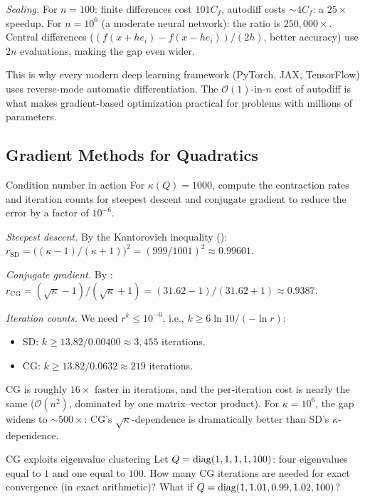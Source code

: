 \textit{Scaling.}
For $n = 100$: finite differences cost $101 C_f$, autodiff costs $\sim 4 C_f$: a $25\times$ speedup.
For $n = 10^6$ (a moderate neural network): the ratio is $250{,}000\times$.
Central differences ($(f(x + he_i) - f(x - he_i))/(2h)$, better accuracy) use $2n$ evaluations, making the gap even wider.

This is why every modern deep learning framework (PyTorch, JAX, TensorFlow) uses reverse-mode automatic differentiation.
The $\mathcal{O}(1)$-in-$n$ cost of autodiff is what makes gradient-based optimization practical for problems with millions of parameters.

\subsection{Gradient Methods for Quadratics}\label{app:ex-quadratic}

\begin{exercise}{Condition number in action}\label{ex:kappa-1000}
	For $\kappa(Q) = 1000$, compute the contraction rates and iteration counts for steepest descent and conjugate gradient to reduce the error by a factor of $10^{-6}$.
\end{exercise}

\solution
\textit{Steepest descent.}
By the Kantorovich inequality ():
$r_{\mathrm{SD}} = \bigl((\kappa - 1)/(\kappa + 1)\bigr)^2 = (999/1001)^2 \approx 0.99601$.

\textit{Conjugate gradient.}
By :
$r_{\mathrm{CG}} = (\sqrt{\kappa} - 1)/(\sqrt{\kappa} + 1) = (31.62 - 1)/(31.62 + 1) \approx 0.9387$.

\textit{Iteration counts.}
We need $r^k \leq 10^{-6}$, i.e., $k \geq 6\ln 10 / (-\ln r)$:
\begin{itemize}
	\item SD: $k \geq 13.82 / 0.00400 \approx 3{,}455$ iterations.
	\item CG: $k \geq 13.82 / 0.0632 \approx 219$ iterations.
\end{itemize}
CG is roughly $16\times$ faster in iterations, and the per-iteration cost is nearly the same ($\mathcal{O}(n^2)$, dominated by one matrix--vector product).
For $\kappa = 10^6$, the gap widens to $\sim 500\times$: CG's $\sqrt{\kappa}$-dependence is dramatically better than SD's $\kappa$-dependence.

\begin{exercise}{CG exploits eigenvalue clustering}\label{ex:cg-few-eigenvalues}
	Let $Q = \operatorname{diag}(1, 1, 1, 1, 100)$: four eigenvalues equal to $1$ and one equal to $100$.
	How many CG iterations are needed for exact convergence (in exact arithmetic)?
	What if $Q = \operatorname{diag}(1, 1.01, 0.99, 1.02, 100)$?
\end{exercise}

